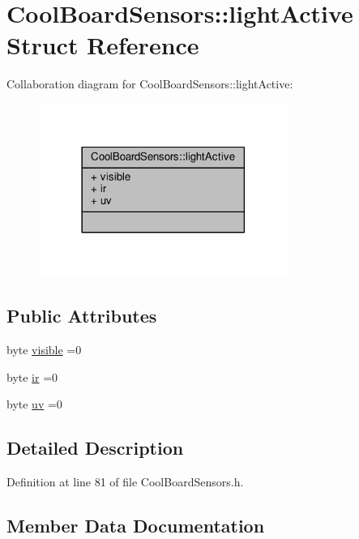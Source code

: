 \hypertarget{structCoolBoardSensors_1_1lightActive}{}\section{Cool\+Board\+Sensors\+:\+:light\+Active Struct Reference}
\label{structCoolBoardSensors_1_1lightActive}


Collaboration diagram for Cool\+Board\+Sensors\+:\+:light\+Active\+:
\nopagebreak
\begin{figure}[H]
\begin{center}
\leavevmode
\includegraphics[width=230pt]{structCoolBoardSensors_1_1lightActive__coll__graph}
\end{center}
\end{figure}
\subsection*{Public Attributes}
\begin{DoxyCompactItemize}
\item 
byte \hyperlink{structCoolBoardSensors_1_1lightActive_abcbba296b6a95e67c0cd2555d9dd50c7}{visible} =0
\item 
byte \hyperlink{structCoolBoardSensors_1_1lightActive_a67700895349b95ceb263f1a6da756315}{ir} =0
\item 
byte \hyperlink{structCoolBoardSensors_1_1lightActive_a949a7aaf5166d981de8fe0fd93da20d6}{uv} =0
\end{DoxyCompactItemize}


\subsection{Detailed Description}


Definition at line 81 of file Cool\+Board\+Sensors.\+h.



\subsection{Member Data Documentation}
\mbox{\label{structCoolBoardSensors_1_1lightActive_a67700895349b95ceb263f1a6da756315}} 
